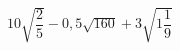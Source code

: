 \begin{ex}[type=expression]
	\begin{condition}
		\( 10\sqrt{\dfrac{2}{5}}-0,5\sqrt{160}+3\sqrt{1\dfrac{1}{9}} \)
	\end{condition}
\end{ex}